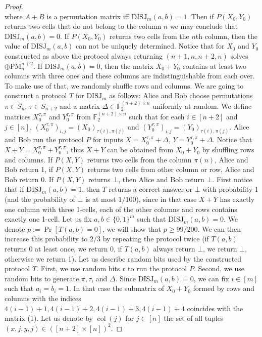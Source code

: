 \documentclass[10pt,a4paper]{article}
\begin{document}
\begin{proof}
\[\]
where $A+B$ is a permutation matrix iff $\mathrm{DISJ}_m(a,b)=1$. Then if $P(X_0,Y_0)$ returns two cells that do not belong to the column $n$ we may conclude that $\mathrm{DISJ}_m(a,b)=0$. If $P(X_0,Y_0)$ returns two cells from the $n$th column, then the value of $\mathrm{DISJ}_m(a,b)$ can not be uniquely determined. Notice that for $X_0$ and $Y_0$ constructed as above the protocol always returning $(n+1,n,n+2,n)$ solves $\oplus\mathrm{PM}_n^{n+2}$.
If $\mathrm{DISJ}_m(a,b)=0$, then the matrix $X_0+Y_0$ contains at least two columns with three ones and these columns are indistinguishable from each over. To make use of that, we randomly shuffle rows and columns.
We are going to construct a protocol $T$ for $\mathrm{DISJ}_m$ as follows: Alice and Bob choose permutations $\pi\in S_n$, $\tau\in S_{n+2}$ and a matrix $\Delta\in\mathbb F_2^{(n+2)\times n}$ uniformly at random. We define matrices $X_0^{\tau,\pi}$ and $Y_0^{\tau,\pi}$ from $\mathbb F_2^{(n+2)\times n}$ such that for each $i\in[n+2]$ and $j\in[n]$, $(X_0^{\tau,\pi})_{i,j}=(X_0)_{\tau(i),\pi(j)}$ and $(Y_0^{\tau,\pi})_{i,j}=(Y_0)_{\tau(i),\pi(j)}$. Alice and Bob run the protocol $P$ for inputs $X=X_0^{\tau,\pi}+\Delta$, $Y=Y_0^{\tau,\pi}+\Delta$. Notice that $X+Y=X_0^{\tau,\pi}+Y_0^{\tau,\pi}$, thus $X+Y$ can be obtained from $X_0+Y_0$ by shuffling rows and columns. If $P(X,Y)$ returns two cells from the column $\pi(n)$, Alice and Bob return 1, if $P(X,Y)$ returns two cells from other column or row, Alice and Bob return 0. If $P(X,Y)$ returns $\bot$, then Alice and Bob return $\bot$.
First notice that if $\mathrm{DISJ}_m(a,b)=1$, then $T$ returns a correct answer or $\bot$ with probability 1 (and the probability of $\bot$ is at most $1/100$), since in that case $X+Y$ has exactly one column with three 1-cells, each of the other columns and rows contains exactly one 1-cell. Let us fix $a,b\in\{0,1\}^m$ such that $\mathrm{DISJ}_m(a,b)=0$. We denote $p:=\Pr[T(a,b)=0]$, we will show that $p\ge99/200$. We can then increase this probability to $2/3$ by repeating the protocol twice (if $T(a,b)$ returns 0 at least once, we return 0, if $T(a,b)$ always return $\bot$, we return $\bot$, otherwise we return 1).
Let us describe random bits used by the constructed protocol $T$. First, we use random bits $r$ to run the protocol $P$. Second, we use random bits to generate $\pi,\tau$, and $\Delta$. Since $\mathrm{DISJ}_m(a,b)=0$, we can fix $i\in[m]$ such that $a_i=b_i=1$. In that case the submatrix of $X_0+Y_0$ formed by rows and columns with the indices $4(i-1)+1,4(i-1)+2,4(i-1)+3,4(i-1)+4$ coincides with the matrix (1). Let us denote by $\operatorname{col}(j)$ for $j\in[n]$ the set of all tuples $(x,j,y,j)\in([n+2]\times[n])^2$.

\end{proof}
\end{document}
